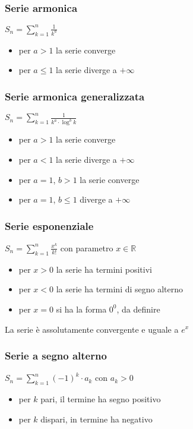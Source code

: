 \documentclass[a4paper]{article}
\begin{document}
\subsubsection*{Serie armonica}
\(\displaystyle S_n = \sum_{k = 1}^{n} \frac{1}{k^a}\)
\begin{itemize}
	\item per \(a > 1\) la serie converge
	\item per \(a \leq 1\) la serie diverge a \(+ \infty\)
\end{itemize}

\subsubsection*{Serie armonica generalizzata}
\(\displaystyle S_n = \sum_{k = 1}^{n} \frac{1}{k^a \cdot \log^b k}\)
\begin{itemize}
	\item per \(a > 1\) la serie converge
	\item per \(a < 1\) la serie diverge a \(+ \infty\)
	\item per \(a = 1\), \(b > 1\) la serie converge
	\item per \(a = 1\), \(b \leq 1\) diverge a \(+ \infty\)
\end{itemize}

\subsubsection*{Serie esponenziale}
\(\displaystyle S_n = \sum_{k = 1}^{n} \frac{x^k}{k!}\) con parametro \(x \in \mathbb{R}\)
\begin{itemize}
	\item per \(x > 0\) la serie ha termini positivi
	\item per \(x < 0\) la serie ha termini di segno alterno
	\item per \(x = 0\) si ha la forma \(0^0\), da definire
\end{itemize}
La serie è assolutamente convergente e uguale a \(e^x\)

\subsubsection*{Serie a segno alterno}
\(\displaystyle S_n = \sum_{k = 1}^{n} (-1)^k \cdot a_k\) con \(a_k > 0\)
\begin{itemize}
	\item per \(k\) pari, il termine ha segno positivo
	\item per \(k\) dispari, in termine ha negativo
\end{itemize}
\end{document}
